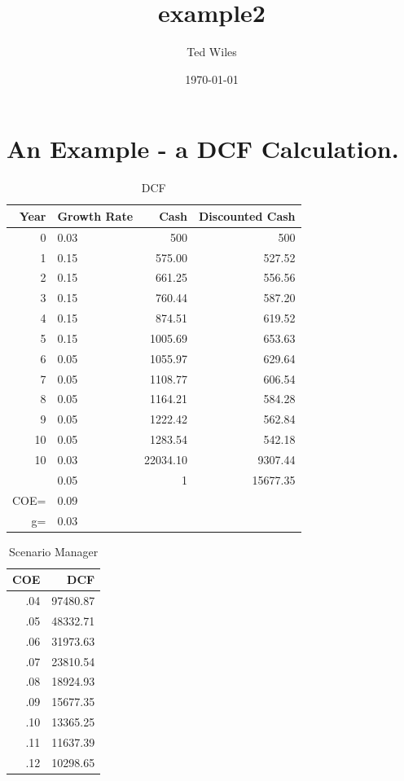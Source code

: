 \documentclass[11pt]{article}
\author{Ted Wiles}
\date{\today}
\title{example2}
\begin{document}
\maketitle
\tableofcontents

\section{An Example - a DCF Calculation.}
\label{sec-1}

\begin{table}[htb]
\caption{\label{DCF}DCF}
\begin{tabular}{rlrr}
Year & Growth Rate \footnotemark & Cash & Discounted Cash\\
\hline
0 & 0.03 & 500 & 500\\
1 & 0.15 \footnotemark & 575.00 & 527.52\\
2 & 0.15 \footnotemark[2]{} & 661.25 & 556.56\\
3 & 0.15 \footnotemark[2]{} & 760.44 & 587.20\\
4 & 0.15 \footnotemark[2]{} & 874.51 & 619.52\\
5 & 0.15 \footnotemark[2]{} & 1005.69 & 653.63\\
6 & 0.05 \footnotemark & 1055.97 & 629.64\\
7 & 0.05 \footnotemark[3]{} & 1108.77 & 606.54\\
8 & 0.05 \footnotemark[3]{} & 1164.21 & 584.28\\
9 & 0.05 \footnotemark[3]{} & 1222.42 & 562.84\\
10 & 0.05 \footnotemark[3]{} & 1283.54 & 542.18\\
10 & 0.03 & 22034.10 & 9307.44\\
 & 0.05 & 1 & 15677.35\\
\hline
COE= & 0.09 \footnotemark &  & \\
g= & 0.03 \footnotemark[1]{} &  & \\
\end{tabular}
\end{table}

\begin{table}[htb]
\caption{\label{ScenarioManager}Scenario Manager}
\begin{tabular}{rr}
COE & DCF \footnotemark\\
\hline
.04 & 97480.87\\
.05 & 48332.71\\
.06 & 31973.63\\
.07 & 23810.54\\
.08 & 18924.93\\
.09 & 15677.35\\
.10 & 13365.25\\
.11 & 11637.39\\
.12 & 10298.65\\
\end{tabular}
\end{table}
\end{document}
